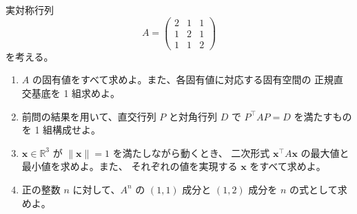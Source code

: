 
実対称行列
\[
  A =
  \begin{pmatrix}
    2 & 1 & 1 \\
    1 & 2 & 1 \\
    1 & 1 & 2
  \end{pmatrix}
\]
を考える。

\begin{enumerate}
  \item $A$ の固有値をすべて求めよ。また、各固有値に対応する固有空間の
    正規直交基底を 1 組求めよ。

  \item 前問の結果を用いて、直交行列 $P$ と対角行列 $D$ で
    $P^{\top} A P = D$ を満たすものを 1 組構成せよ。

  \item $\bm{x} \in \mathbb{R}^3$ が $\|\bm{x}\| = 1$ を満たしながら動くとき、
    二次形式 $\bm{x}^{\top} A \bm{x}$ の最大値と最小値を求めよ。また、
    それぞれの値を実現する $\bm{x}$ をすべて求めよ。

  \item 正の整数 $n$ に対して、$A^n$ の $(1,1)$ 成分と $(1,2)$ 成分を
    $n$ の式として求めよ。
\end{enumerate}
